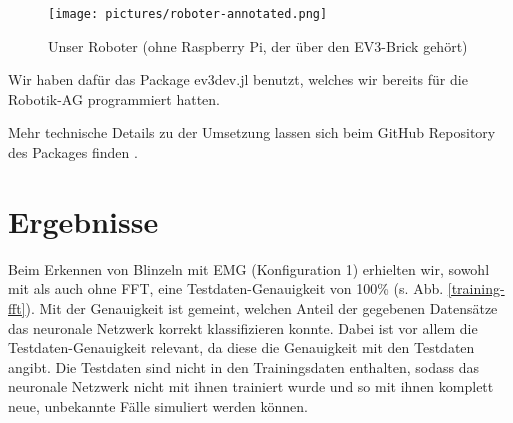 \documentclass[11pt]{scrartcl}
\begin{document}
	\begin{figure}[H]
		\centering
		\texttt{[image: pictures/roboter-annotated.png]}
		\caption{Unser Roboter (ohne Raspberry Pi, der über den EV3-Brick gehört)}
		\label{Robot}
	\end{figure}

	Wir haben dafür das Package ev3dev.jl benutzt, welches wir bereits für die Robotik-AG programmiert hatten.
	
	Mehr technische Details zu der Umsetzung lassen sich beim GitHub Repository des Packages finden \cite{ev3dev}.
	



	\section{Ergebnisse}

	Beim Erkennen von Blinzeln mit EMG (Konfiguration 1) erhielten wir, sowohl mit als auch ohne FFT, eine Testdaten-Genauigkeit von 100\% (s. Abb. \ref{training-fft}). Mit der Genauigkeit ist gemeint, welchen Anteil der gegebenen Datensätze das neuronale Netzwerk korrekt klassifizieren konnte. Dabei ist vor allem die Testdaten-Genauigkeit relevant, da diese die Genauigkeit mit den Testdaten angibt. Die Testdaten sind nicht in den Trainingsdaten enthalten, sodass das neuronale Netzwerk nicht mit ihnen trainiert wurde und so mit ihnen komplett neue, unbekannte Fälle simuliert werden können.

	\begin{figure}[H]
	\end{figure}
\end{document}
